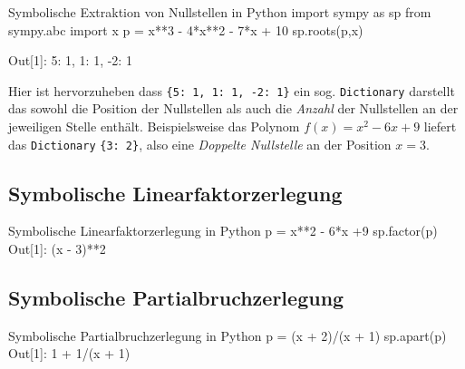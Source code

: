 


\begin{python}{Symbolische Extraktion von Nullstellen in Python}
import sympy as sp
from sympy.abc import x
p = x**3 - 4*x**2 - 7*x + 10
sp.roots(p,x)

Out[1]: {5: 1, 1: 1, -2: 1}
\end{python}

Hier ist hervorzuheben dass \texttt{\{5: 1, 1: 1, -2: 1\}} ein sog. \texttt{Dictionary} darstellt das sowohl die Position der Nullstellen als auch die \emph{Anzahl} der Nullstellen an der jeweiligen Stelle enthält. 
Beispielsweise das Polynom $f(x) = x^2 - 6x + 9$ liefert das \texttt{Dictionary} \texttt{\{3: 2\}}, also eine \emph{Doppelte Nullstelle} an der Position $x=3$. 








\subsection{Symbolische Linearfaktorzerlegung}
\begin{python}{Symbolische Linearfaktorzerlegung in Python}
p = x**2 - 6*x +9
sp.factor(p)
Out[1]: (x - 3)**2
\end{python}


\subsection{Symbolische Partialbruchzerlegung}

\begin{python}{Symbolische Partialbruchzerlegung in Python}
p = (x + 2)/(x + 1)
sp.apart(p)
Out[1]: 1 + 1/(x + 1)
\end{python}




